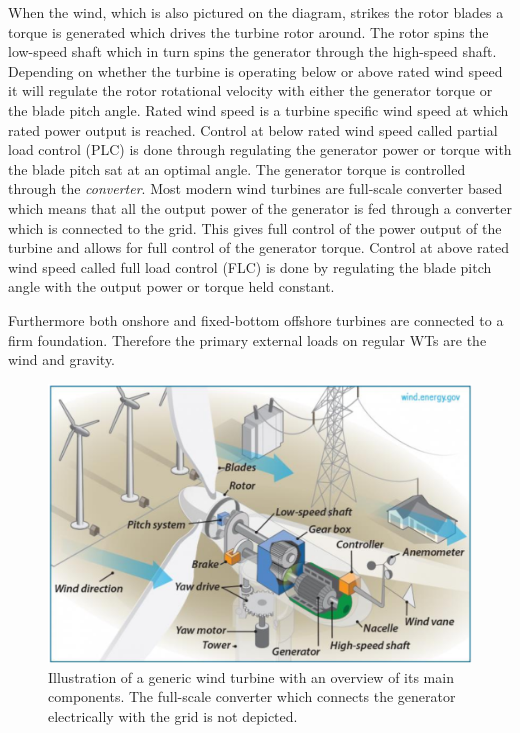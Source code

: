 When the wind, which is also pictured on the diagram, strikes the rotor blades a torque is generated which drives the turbine rotor around. The rotor spins the low-speed shaft which in turn spins the generator through the high-speed shaft. Depending on whether the turbine is operating below or above rated wind speed it will regulate the rotor rotational velocity with either the generator torque or the blade pitch angle. Rated wind speed is a turbine specific wind speed at which rated power output is reached.
Control at below rated wind speed called partial load control (PLC) is done through regulating the generator power or torque with the blade pitch sat at an optimal angle. The generator torque is controlled through the \textit{converter}. Most modern wind turbines are full-scale converter based which means that all the output power of the generator is fed through a converter which is connected to the grid. This gives full control of the power output of the turbine and allows for full control of the generator torque. Control at above rated wind speed called full load control (FLC) is done by regulating the blade pitch angle with the output power or torque held constant.

Furthermore both onshore and fixed-bottom offshore turbines are connected to a firm foundation. Therefore the primary external loads on regular WTs are the wind and gravity.
\begin{figure}[ht]
	\centering
	\includegraphics[width=0.7\linewidth]{Graphics/WtComponents.png}
	\caption{Illustration of a generic wind turbine with an overview of its main components. The full-scale converter which connects the generator electrically with the grid is not depicted.}
	\label{fig:wt_components}
\end{figure}


